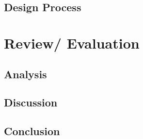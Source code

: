 \documentclass[UKenglish, a4paper]{ifimaster}
\begin{document}
\chapter{ Design Process}



\part{Review/ Evaluation }

\chapter{ Analysis}


\chapter{ Discussion}


\chapter{ Conclusion}


\backmatter{}

\printbibliography[nottype=online]
\printbibliography[type=online,title={Web sources}]

% 
\end{document}
